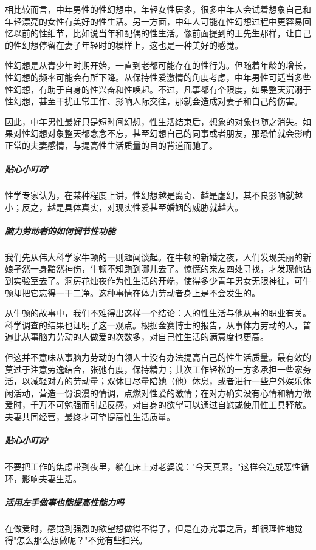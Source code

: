 相比较而言，中年男性的性幻想中，年轻女性居多，很多中年人会试着想象自己和年轻漂亮的女性有美好的性生活。另一方面，中年人可能在性幻想过程中更容易回忆以前的性细节，比如说当年和配偶的性生活。像前面提到的王先生那样，让自己的性幻想停留在妻子年轻时的模样上，这也是一种美好的感觉。

性幻想是从青少年时期开始，一直到老都可能存在的性行为。但随着年龄的增长，性幻想的频率可能会有所下降。从保持性爱激情的角度考虑，中年男性可适当多些性幻想，有助于自身的性兴奋和性唤起。不过，凡事都有个限度，如果整天沉溺于性幻想，甚至干扰正常工作、影响人际交往，那就会造成对妻子和自己的伤害。

因此，中年男性最好只是短时间幻想，性生活结束后，想象的对象也随之消失。如果对性幻想对象整天都念念不忘，甚至幻想自己的同事或者朋友，那恐怕就会影响正常的夫妻感情，与提高性生活质量的目的背道而驰了。

\subparagraph{贴心小叮咛}

性学专家认为，在某种程度上讲，性幻想越是离奇、越是虚幻，其不良影响就越小；反之，越是具体真实，对现实性爱甚至婚姻的威胁就越大。

\subparagraph{脑力劳动者的如何调节性功能}

我们先从伟大科学家牛顿的一则趣闻谈起。在牛顿的新婚之夜，人们发现美丽的新娘孑然一身黯然神伤，牛顿不知跑到哪儿去了。惊慌的亲友四处寻找，才发现他钻到实验室去了。洞房花烛夜作为性生活的开端，使得多少青年男女无限神往，可牛顿却把它忘得一干二净。这种事情在体力劳动者身上是不会发生的。

从牛顿的故事中，我们不难得出这样一个结论：人的性生活与他从事的职业有关。科学调查的结果也证明了这一观点。根据金赛博士的报告，从事体力劳动的人，普遍比从事脑力劳动的人做爱的次数多，对自己性生活的满意度也更高。

但这并不意味从事脑力劳动的白领人士没有办法提高自己的性生活质量。最有效的莫过于注意劳逸结合，张弛有度，保持精力；其次工作轻松的一方多承担一些家务活，以减轻对方的劳动量；双休日尽量陪她（他）休息，或者进行一些户外娱乐休闲活动，营造一份浪漫的情调，点燃对性爱的激情；在对方确实没有心情和精力做爱时，千万不可勉强而引起反感，对自身的欲望可以通过自慰或使用性工具释放。夫妻共同经营，最终才可望提高性生活质量。

\subparagraph{贴心小叮咛}

不要把工作的焦虑带到夜里，躺在床上对老婆说："今天真累。"这样会造成恶性循环，影响夫妻生活。

\subparagraph{活用左手做事也能提高性能力吗}

在做爱时，感觉到强烈的欲望想做得不得了，但是在办完事之后，却很理性地觉得"怎么那么想做呢？"不觉有些扫兴。

